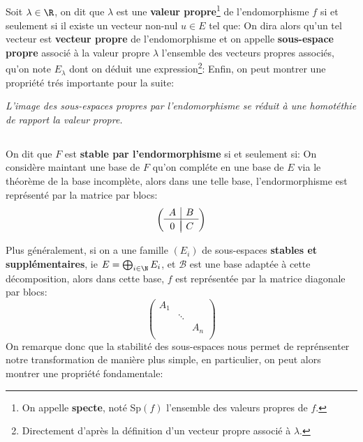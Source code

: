 \subsection*{}
Soit \(\lambda \in \R\), on dit que \(\lambda\) est une \textbf{valeur propre}\footnote[2]{On appelle \textbf{specte}, noté Sp\((f)\) l'ensemble des valeurs propres de \(f\).} de l'endomorphisme \(f\) si et seulement si il existe un vecteur non-nul \(u \in E\) tel que:
On dira alors qu'un tel vecteur est \textbf{vecteur propre} de l'endomorphisme et on appelle \textbf{sous-espace propre} associé à la valeur propre \(\lambda\) l'ensemble des vecteurs propres associés, qu'on note \(E_\lambda\) dont on déduit une expression\footnote[3]{Directement d'après la définition d'un vecteur propre associé à \(\lambda\).}:
Enfin, on peut montrer une propriété trés importante pour la suite:
\begin{center}
   \textit{L'image des sous-espaces propres par l'endomorphisme se réduit à une homotéthie de rapport la valeur propre.}
\end{center}

\subsection*{}
On dit que \(F\) est \textbf{stable par l'endormorphisme} si et seulement si:
On considère maintant une base de \(F\) qu'on compléte en une base de \(E\) via le théorème de la base incomplète, alors dans une telle base, l'endormorphisme est représenté par la matrice par blocs:
\[
   \left(\begin{array}{c|c}
      A & B\\
      \hline\\[-1.7\medskipamount]
      0 & C
   \end{array}\right)
\]
\pagebreak

Plus généralement, si on a une famille \((E_i)\) de sous-espaces \textbf{stables et supplémentaires}, ie \(E = \bigoplus_{i \in \N} E_i\), et \(\mathcal{B}\) est une base adaptée à cette décomposition, alors dans cette base, \(f\) est représentée par la matrice diagonale par blocs:
\[
   \left(\begin{array}{ccc}
      A_1 & {} & {}\\
      {} & \ddots & {}\\
      {} & {} & A_n\\
   \end{array}\right)
\]
On remarque donc que la stabilité des sous-espaces nous permet de reprénsenter notre transformation de manière plus simple, en particulier, on peut alors montrer une propriété fondamentale:

